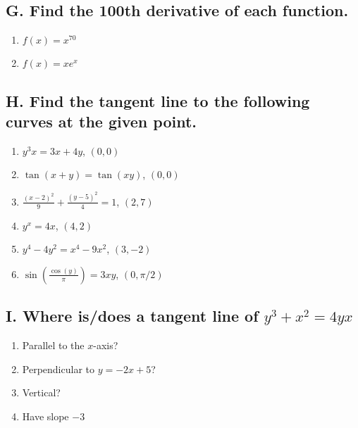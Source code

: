 \documentclass{article}
\begin{document}
\subsection*{G. Find the 100th derivative of each function.}
\begin{multicols}{2}
\begin{enumerate}
\item $f(x)=x^{70}$
\item $f(x)=xe^{x}$
\end{enumerate}
\end{multicols}


\subsection*{H. Find the tangent line to the following curves at the given point.}

\begin{multicols}{3}
\begin{enumerate}
\item $y^{3}x=3x+4y$, $(0,0)$
\item $\tan\left(x+y\right)=\tan\left(xy\right)$, $(0,0)$
\item $\frac{\left(x-2\right)^{2}}{9}+\frac{\left(y-5\right)^{2}}{4}=1$, $(2,7)$
\item $y^{x}=4x$, $(4,2)$
\item $y^{4}-4y^{2}=x^{4}-9x^{2}$, $(3,-2)$
\item $\sin\left(\frac{\cos\left(y\right)}{\pi}\right)=3xy$, $(0,\pi/2)$
\end{enumerate}
\end{multicols}


\subsection*{I. Where is/does a tangent line of $y^{3}+x^{2}=4yx$}

\begin{multicols}{2}
\begin{enumerate}
\item Parallel to the $x$-axis?
\item Perpendicular to $y=-2x+5$?
\item Vertical?
\item Have slope $-3$
\end{enumerate}
\end{multicols}




\newpage
\end{document}
